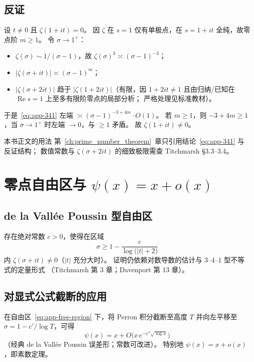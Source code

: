 \subsection{反证}
设 $t\neq 0$ 且 $\zeta(1+it)=0$。
因 $\zeta$ 在 $s=1$ 仅有单极点，在 $s=1+it$ 全纯，故零点阶 $m\ge 1$。
令 $\sigma\to 1^+$：
\begin{itemize}
  \item $\zeta(\sigma)\sim 1/(\sigma-1)$，故 $\zeta(\sigma)^{3}\asymp (\sigma-1)^{-3}$；
  \item $|\zeta(\sigma+it)|\asymp (\sigma-1)^{m}$；
  \item $|\zeta(\sigma+2it)|$ 趋于 $|\zeta(1+2it)|$（有限，因 $1+2it\neq 1$ 且由归纳/已知在 $\operatorname{Re}s=1$ 上至多有限阶零点的局部分析；
    严格处理见标准教材）。
\end{itemize}
于是~\eqref{eq:app-341} 左端
$\asymp (\sigma-1)^{-3+4m}\cdot O(1)$。
若 $m\ge 1$，则 $-3+4m\ge 1$，当 $\sigma\to 1^+$ 时左端 $\to 0$，与 $\ge 1$ 矛盾。
故 $\zeta(1+it)\neq 0$。

\begin{remark}{本书正文的用法}{}
第~\ref{ch:prime_number_theorem}~章只引用结论~\eqref{eq:app-341} 与反证结构；
数值常数与 $\zeta(\sigma+2it)$ 的细致极限需查 Titchmarsh §3.3--3.4。
\end{remark}

\section{零点自由区与 \texorpdfstring{$\psi(x)=x+o(x)$}{psi=x+o(x)}}
\label{sec:app-zero-free}

\subsection{de la Vallée Poussin 型自由区}
存在绝对常数 $c>0$，使得在区域
\begin{equation}
  \sigma\ge 1-\frac{c}{\log\bigl(|t|+2\bigr)}
  \label{eq:app-free-region}
\end{equation}
内 $\zeta(\sigma+it)\neq 0$（$|t|$ 充分大时）。
证明仍依赖对数导数的估计与 $3$--$4$--$1$ 型不等式的定量形式
（Titchmarsh 第 3 章；Davenport 第 13 章）。

\subsection{对显式公式截断的应用}
在自由区~\eqref{eq:app-free-region} 下，将 Perron 积分截断至高度 $T$ 并向左平移至
$\sigma=1-c'/\log T$，可得
\begin{equation}
  \psi(x)
  =x
  +O\bigl(x\,e^{-c''\sqrt{\log x}}\bigr)
  \label{eq:app-psi-error}
\end{equation}
（经典 de la Vallée Poussin 误差形；常数可改进）。
特别地 $\psi(x)=x+o(x)$，即素数定理。

